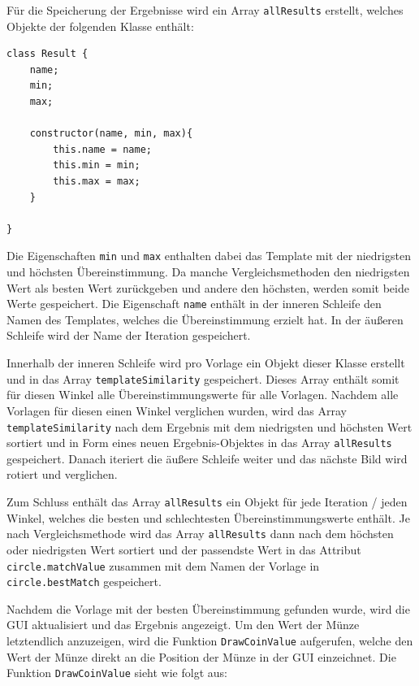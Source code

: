 Für die Speicherung der Ergebnisse wird ein Array \texttt{allResults} erstellt, welches Objekte der folgenden Klasse enthält:

\begin{lstlisting}[style=JavaScript]
class Result {
    name;
    min;
    max;

    constructor(name, min, max){
        this.name = name;
        this.min = min;
        this.max = max;
    }

}
\end{lstlisting}

Die Eigenschaften \texttt{min} und \texttt{max} enthalten dabei das Template mit der niedrigsten und höchsten Übereinstimmung. Da manche Vergleichsmethoden den niedrigsten Wert als besten Wert zurückgeben und andere den höchsten, werden somit beide Werte gespeichert. Die Eigenschaft \texttt{name} enthält in der inneren Schleife den Namen des Templates, welches die Übereinstimmung erzielt hat. In der äußeren Schleife wird der Name der Iteration gespeichert.

Innerhalb der inneren Schleife wird pro Vorlage ein Objekt dieser Klasse erstellt und in das Array \texttt{templateSimilarity} gespeichert. Dieses Array enthält somit für diesen Winkel alle Übereinstimmungswerte für alle Vorlagen. Nachdem alle Vorlagen für diesen einen Winkel verglichen wurden, wird das Array \texttt{templateSimilarity} nach dem Ergebnis mit dem niedrigsten und höchsten Wert sortiert und in Form eines neuen Ergebnis-Objektes in das Array \texttt{allResults} gespeichert. Danach iteriert die äußere Schleife weiter und das nächste Bild wird rotiert und verglichen.

Zum Schluss enthält das Array \texttt{allResults} ein Objekt für jede Iteration / jeden Winkel, welches die besten und schlechtesten Übereinstimmungswerte enthält. Je nach Vergleichsmethode wird das Array \texttt{allResults} dann nach dem höchsten oder niedrigsten Wert sortiert und der passendste Wert in das Attribut \texttt{circle.matchValue} zusammen mit dem Namen der Vorlage in \texttt{circle.bestMatch} gespeichert.

Nachdem die Vorlage mit der besten Übereinstimmung gefunden wurde, wird die GUI aktualisiert und das Ergebnis angezeigt. Um den Wert der Münze letztendlich anzuzeigen, wird die Funktion \texttt{DrawCoinValue} aufgerufen, welche den Wert der Münze direkt an die Position der Münze in der GUI einzeichnet. Die Funktion \texttt{DrawCoinValue} sieht wie folgt aus:

